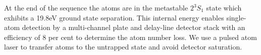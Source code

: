 	At the end of the sequence the atoms are in the metastable $2^3S_1$ state which exhibits a 19.8eV ground state separation.
	This internal energy enables single-atom detection by a multi-channel plate and delay-line detector stack with an efficiency of 8 per cent\cite{Manning10} to determine the atom number loss.
	We use a pulsed atom laser \cite{Manning10,Henson18} to transfer atoms to the untrapped state and avoid detector saturation.









